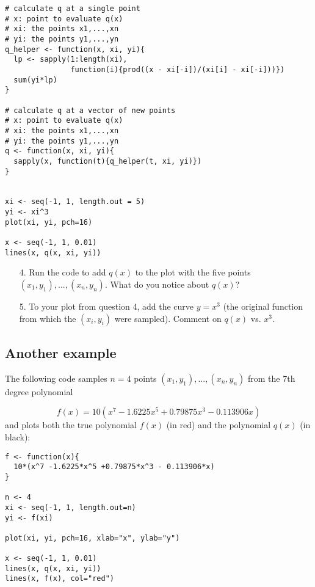 \documentclass[11pt]{article}
\begin{document}
\begin{verbatim}
# calculate q at a single point
# x: point to evaluate q(x)
# xi: the points x1,...,xn
# yi: the points y1,...,yn
q_helper <- function(x, xi, yi){
  lp <- sapply(1:length(xi), 
               function(i){prod((x - xi[-i])/(xi[i] - xi[-i]))})
  sum(yi*lp)
}

# calculate q at a vector of new points
# x: point to evaluate q(x)
# xi: the points x1,...,xn
# yi: the points y1,...,yn
q <- function(x, xi, yi){
  sapply(x, function(t){q_helper(t, xi, yi)})
}


xi <- seq(-1, 1, length.out = 5)
yi <- xi^3
plot(xi, yi, pch=16)

x <- seq(-1, 1, 0.01)
lines(x, q(x, xi, yi))
\end{verbatim}

\begin{enumerate}
\item[4.] Run the code to add $q(x)$ to the plot with the five points $(x_1, y_1),...,(x_n, y_n)$. What do you notice about $q(x)$?

\vspace{3cm}

\item[5.]  To your plot from question 4, add the curve $y = x^3$ (the original function from which the $(x_i, y_i)$ were sampled). Comment on $q(x)$ vs. $x^3$.
\end{enumerate}

\newpage

\subsection*{Another example}

The following code samples $n=4$ points $(x_1, y_1),...,(x_n, y_n)$ from the 7th degree polynomial

$$f(x) = 10(x^7 - 1.6225x^5 +0.79875x^3 - 0.113906x)$$
and plots both the true polynomial $f(x)$ (in red) and the polynomial $q(x)$ (in black):

\begin{verbatim}
f <- function(x){
  10*(x^7 -1.6225*x^5 +0.79875*x^3 - 0.113906*x)
}

n <- 4
xi <- seq(-1, 1, length.out=n)
yi <- f(xi)

plot(xi, yi, pch=16, xlab="x", ylab="y")

x <- seq(-1, 1, 0.01)
lines(x, q(x, xi, yi))
lines(x, f(x), col="red")
\end{verbatim}
\end{document}
